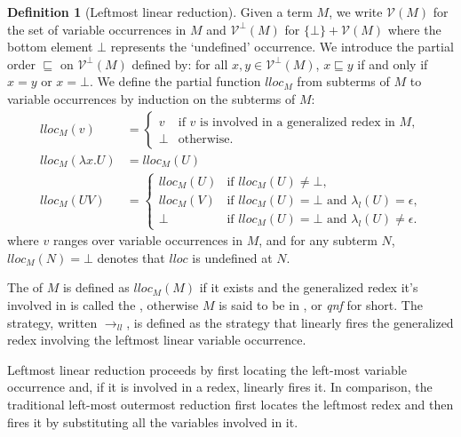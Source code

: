 \documentclass{elsarticle}
\theoremstyle{plain}
\theoremstyle{definition}
\newtheorem{definition}{Definition}[section]
\theoremstyle{remark}
\newcommand\VarSet{\mathcal{V}}
\newcommand{\llred}{\rightarrow_{ll}}
\begin{document}
\begin{definition}[Leftmost linear reduction]
    \label{def:leftmostlinearreduction}
Given a term $M$, we write $\VarSet(M)$ for the set of variable occurrences in $M$
and $\VarSet^\bot(M)$ for $\{\bot \} + \VarSet(M)$ where the bottom element $\bot$ represents the `undefined' occurrence. We introduce the partial order $\sqsubseteq$ on $\VarSet^\bot(M)$ defined by: for all $x,y \in \VarSet^\bot(M)$, $x \sqsubseteq y$ if and only if $x = y$ or $x = \bot$. We define the partial function $lloc_M$ from subterms of $M$ to variable occurrences by induction on the subterms of $M$:
\begin{align*}
lloc_M(v) &=
    \begin{cases}
    v &\mbox{if $v$ is involved in a generalized redex in $M$,} \\
    \bot & \mbox {otherwise.}
    \end{cases}  \\
lloc_M(\lambda x . U) &= lloc_M(U) \\
lloc_M(U V) &= \begin{cases}
                lloc_M(U) &\mbox{if $lloc_M(U)\neq\bot$,} \\
                lloc_M(V) &\mbox{if $lloc_M(U)=\bot$ and $\lambda_l(U) = \epsilon$,} \\
                \bot & \mbox{if $lloc_M(U)=\bot$ and $\lambda_l(U) \neq \epsilon$.}
              \end{cases}
\end{align*}
where $v$ ranges over variable occurrences in $M$,
and for any subterm $N$, $lloc_M(N) = \bot$ denotes that $lloc$ is undefined at $N$.

The  of $M$
is defined as $lloc_M(M)$ if it exists and the generalized redex it's involved in is called the , otherwise $M$ is said to be in , or \emph{qnf} for short.
The  strategy, written $\llred$, is defined as the strategy that linearly fires the generalized redex involving the leftmost linear variable occurrence.
\end{definition}

Leftmost linear reduction proceeds by first locating the left-most variable occurrence and, if it is involved in a redex, linearly fires it. In comparison, the traditional left-most outermost reduction first locates the leftmost redex and then fires it by substituting all the variables involved in it.
\end{document}
